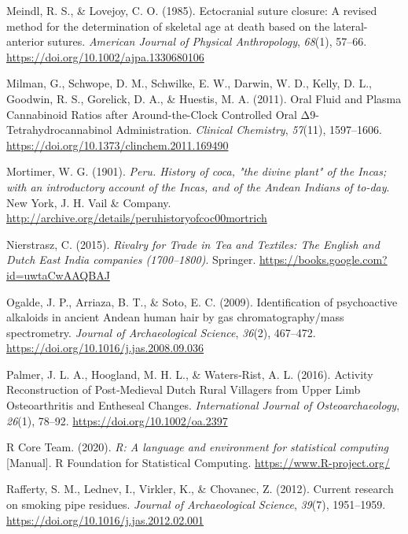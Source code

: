 \documentclass[
]{article}
\newlength{\cslhangindent}
\newenvironment{CSLReferences}[2] %
 {\begin{list}{}{%
  \setlength{\itemindent}{0pt}
  \setlength{\leftmargin}{0pt}
  \setlength{\parsep}{0pt}
  \ifodd #1
   \setlength{\leftmargin}{\cslhangindent}
   \setlength{\itemindent}{-1\cslhangindent}
  \fi
  \setlength{\itemsep}{#2\baselineskip}}}
 {\end{list}}
\begin{document}
\begin{CSLReferences}{1}{0}
Meindl, R. S., \& Lovejoy, C. O. (1985). Ectocranial suture closure: {A}
revised method for the determination of skeletal age at death based on
the lateral-anterior sutures. \emph{American Journal of Physical
Anthropology}, \emph{68}(1), 57--66.
\url{https://doi.org/10.1002/ajpa.1330680106}

Milman, G., Schwope, D. M., Schwilke, E. W., Darwin, W. D., Kelly, D.
L., Goodwin, R. S., Gorelick, D. A., \& Huestis, M. A. (2011). Oral
{Fluid} and {Plasma Cannabinoid Ratios} after {Around-the-Clock
Controlled Oral Δ9-Tetrahydrocannabinol Administration}. \emph{Clinical
Chemistry}, \emph{57}(11), 1597--1606.
\url{https://doi.org/10.1373/clinchem.2011.169490}

Mortimer, W. G. (1901). \emph{Peru. {History} of coca, "the divine
plant" of the {Incas}; with an introductory account of the {Incas}, and
of the {Andean Indians} of to-day}. {New York, J. H. Vail \& Company}.
\url{http://archive.org/details/peruhistoryofcoc00mortrich}

Nierstrasz, C. (2015). \emph{Rivalry for {Trade} in {Tea} and
{Textiles}: {The English} and {Dutch East India} companies
(1700--1800)}. {Springer}.
\url{https://books.google.com?id=uwtaCwAAQBAJ}

Ogalde, J. P., Arriaza, B. T., \& Soto, E. C. (2009). Identification of
psychoactive alkaloids in ancient {Andean} human hair by gas
chromatography/mass spectrometry. \emph{Journal of Archaeological
Science}, \emph{36}(2), 467--472.
\url{https://doi.org/10.1016/j.jas.2008.09.036}

Palmer, J. L. A., Hoogland, M. H. L., \& Waters‐Rist, A. L. (2016).
Activity {Reconstruction} of {Post}‐{Medieval Dutch Rural Villagers}
from {Upper Limb Osteoarthritis} and {Entheseal Changes}.
\emph{International Journal of Osteoarchaeology}, \emph{26}(1), 78--92.
\url{https://doi.org/10.1002/oa.2397}

R Core Team. (2020). \emph{R: {A} language and environment for
statistical computing} {[}Manual{]}. {R Foundation for Statistical
Computing}. \url{https://www.R-project.org/}

Rafferty, S. M., Lednev, I., Virkler, K., \& Chovanec, Z. (2012).
Current research on smoking pipe residues. \emph{Journal of
Archaeological Science}, \emph{39}(7), 1951--1959.
\url{https://doi.org/10.1016/j.jas.2012.02.001}


\end{CSLReferences}
\end{document}
